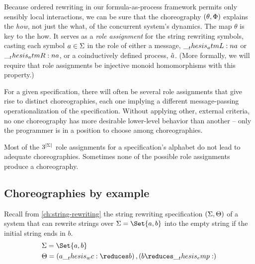 Because ordered rewriting in our formula-as-process framework permits only sensibly local interactions, we can be sure that the choreography $(\theta, \Phi)$ explains the \emph{how}, not just the what, of the concurrent system's dynamics.
The map $\theta$ is key to the how.
It 
serves as a \emph{role assignment} for the string rewriting symbols, casting each symbol $a \in \Sigma$ in the role of either a message, $\__thesis_atmL:n {a}$ or $\__thesis_atmR:n {a}$, or a coinductively defined process, $\hat{a}$.
(More formally, we will require that role assignments be injective monoid homomorphisms with this property.)

For a given specification, there will often be several role assignments that give rise to distinct choreographies, each one implying a different message-passing operationalization of the specification.
Without applying other, external criteria, no one choreography has more desirable lower-level behavior than another -- only the programmer is in a position to choose among choreographies.

Most of the $3^{\lvert\Sigma\rvert}$ role assignments for a specification's alphabet do not lead to adequate choreographies.
Sometimes none of the possible role assignments produce a choreography.

\subsection{Choreographies by example}\label{sec:choreographies:informal}


Recall from \cref{ch:string-rewriting} the string rewriting specification $(\Sigma, \Theta)$ of a system that can rewrite strings over $\sralph = \Set{a,b}$ into the empty string if the initial string ends in $b$.
\begin{equation*}
  \begin{lgathered}
    \sralph = \Set{a,b} \\
    \srsig = (a \wc \reduces b) \,, (b \reduces \emp)
  \end{lgathered}
\end{equation*}

